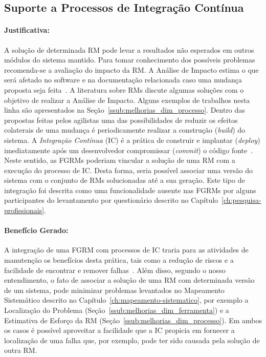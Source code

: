 \subsection{Suporte a Processos de Integração Contínua}\label{sub:suporte_integracao_continua}


\paragraph{Justificativa:}\label{par:justificativa_s05}

A solução de determinada RM pode levar a resultados não esperados em outros
módulos do sistema mantido. Para tomar conhecimento dos possíveis problemas
recomenda-se a avaliação do impacto da RM\@. A Análise de Impacto estima o que
será afetado no software e na documentação relacionada caso uma mudança proposta
seja feita~\cite{arnold1996software}. A literatura sobre RMs discute algumas
soluções com o objetivo de realizar a Análise de Impacto. Alguns exemplos de
trabalhos nesta linha são apresentados na
Seção~\ref{ssub:melhorias_dim_processo}. Dentro das propostas feitas pelos
agilistas uma das possibilidades de reduzir os efeitos colaterais de uma mudança
é periodicamente realizar a construção (\textit{build}) do sistema. A
\textit{Integração Contínua} (IC) é a prática de construir e implantar
(\textit{deploy}) imediatamente após um desenvolvedor compromissar
(\textit{commit}) o código fonte~\cite{aiello2010configuration}. Neste sentido,
as FGRMs poderiam vincular a solução de uma RM com a execução do processo de
IC\@. Desta forma, seria possível associar uma versão do sistema com o conjunto
de RMs solucionadas até a sua geração. Este tipo de integração foi descrita
como uma funcionalidade ausente nas FGRMs por alguns participantes do
levantamento por questionário descrito no
Capítulo~\ref{ch:pesquisa-profissionais}.

\paragraph{Benefício Gerado:}\label{par:papéis_afetados_s05}

A integração de uma FGRM com processos de IC traria para as atividades de
manutenção os benefícios desta prática, tais como a redução de riscos e a
facilidade de encontrar e remover falhas~\cite{fowler2006continuous}.  Além
disso, segundo o nosso entendimento, o fato de associar a solução de uma RM com
determinada versão de um sistema, pode minimizar problemas levantados no
Mapeamento Sistemático descrito no Capítulo~\ref{ch:mapeamento-sistematico},
por exemplo a Localização do Problema
(Seção~\ref{ssub:melhorias_dim_ferramenta}) e a Estimativa de Esforço da RM
(Seção~\ref{ssub:melhorias_dim_processo}). Em ambos os casos é possível
aproveitar a facilidade que a IC propicia em fornecer a localização de uma
falha que, por exemplo, pode ter sido causada pela solução de outra RM\@.

